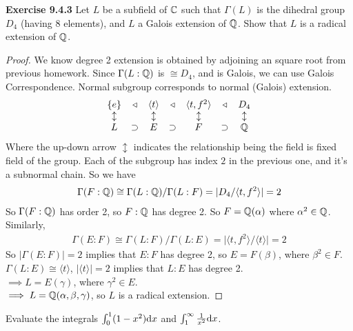 \documentclass{article}
\begin{document}
\begin{homeworkProblem}
    \textbf{Exercise 9.4.3} Let $L$ be a subfield of $\mathbb{C}$ such that $\Gamma(L)$ is the dihedral group $D_4$ (having 8 elements), 
    and $L$ a Galois extension of $\mathbb{Q}$. Show that $L$ is a radical extension of $\mathbb{Q}$.\\
    \begin{proof}
    We know degree 2 extension is obtained by adjoining an square root from previous homework.
    Since $\Gamma(L:\mathbb{Q})$ is $\cong D_4$, and is Galois, we can use Galois Correspondence. Normal subgroup corresponds 
    to normal (Galois) extension.
    \begin{align}
        \begin{matrix}
            \{e\} & \triangleleft & \langle t \rangle & \triangleleft & \langle t, f^2 \rangle & \triangleleft  & D_4 \\
            \updownarrow & & \updownarrow & & \updownarrow & & \updownarrow \\ 
            L & \supset & E & \supset & F & \supset & \mathbb{Q} \\
        \end{matrix}
    \end{align}
    Where the up-down arrow $\updownarrow$ indicates the relationship being the field is fixed field of the group. 
    Each of the subgroup has index $2$ in the previous one, and it's a subnormal chain. So we have
    \begin{align}
       \Gamma (F:\mathbb{Q}) \cong \Gamma (L: \mathbb{Q}) / \Gamma(L:F) = \lvert D_4 / \langle t, f^2 \rangle \rvert = 2
    \end{align}
    So $\Gamma(F:\mathbb{Q})$ has order 2, so $F:\mathbb{Q}$ has degree 2. So $F=\mathbb{Q}(\alpha)$ where $\alpha^2 \in \mathbb{Q}$.
    Similarly, 
    \begin{align}
        \Gamma(E:F) \cong \Gamma(L:F)/\Gamma(L:E) = \lvert \langle t, f^2 \rangle / \langle t \rangle \rvert = 2
    \end{align}
    So $\lvert \Gamma (E:F) \rvert = 2$ implies that $E:F$ has degree 2, so $E = F(\beta)$, where $\beta^2 \in F$.\\
    $\Gamma (L:E) \cong \langle t \rangle$, $\lvert \langle t \rangle \rvert = 2$ implies that $L:E$ has degree 2.\\
    $ \implies L = E( \gamma)$, where $\gamma^2 \in E$.\\
    $\implies L = \mathbb{Q} (\alpha, \beta, \gamma)$, so $L$ is a radical extension.

        
    \end{proof}
    


\end{homeworkProblem}

\pagebreak


\begin{homeworkProblem}[6]
    Evaluate the integrals
    \(\int_0^1 (1 - x^2) \mathrm{d}x\)
    and
    \(\int_1^{\infty} \frac{1}{x^2} \mathrm{d}x\).
\end{homeworkProblem}
\end{document}
